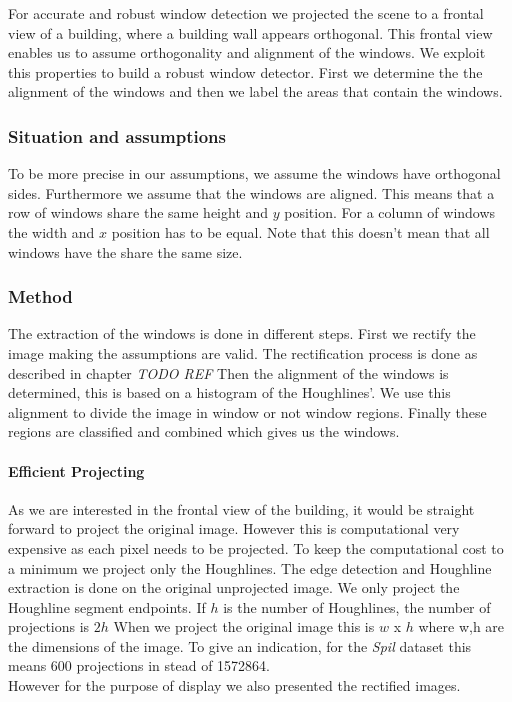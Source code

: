 For accurate and robust window detection we projected the scene to a frontal
view of a building, where a building wall appears orthogonal. This frontal
view enables us to assume orthogonality and alignment of the windows. We
exploit this properties to build a robust window detector. First we determine
the the alignment of the windows and then we label the areas that contain the
windows. 

\subsubsection{Situation and assumptions}
To be more precise in our assumptions, we assume the windows have orthogonal sides.  Furthermore we
assume that the windows are aligned. This means that a row of windows share the
same height and $y$ position. For a column of windows the width and $x$
position has to be equal.  Note that this doesn't mean that all windows have the
share the same size.

\subsubsection{Method}
The extraction of the windows is done in different steps. First we rectify the 
image making the assumptions are valid. The rectification process is done as described in chapter \emph{TODO REF}
Then the alignment of the windows is determined, this is based on a histogram 
of the Houghlines'. We use this alignment to divide the
image in window or not window regions.  Finally these regions are classified
and combined which gives us the windows.


\paragraph{Efficient Projecting} 
As we are interested in the frontal view of the building, it would be straight
forward to project the original image. However this is computational
very expensive as each pixel needs to be projected. To keep the computational cost to a minimum we project only the
Houghlines. The edge detection and Houghline extraction is done on the original
unprojected image. We only project the Houghline segment
endpoints. If $h$ is the number of Houghlines, the number of projections is $2h$
When we project the original image this is $w$ x $h$ where w,h are the dimensions of
the image. To give an indication, for the \emph{Spil} dataset %
this means 600 projections in stead of 1572864.\\
However for the purpose of display we also presented the rectified images.


